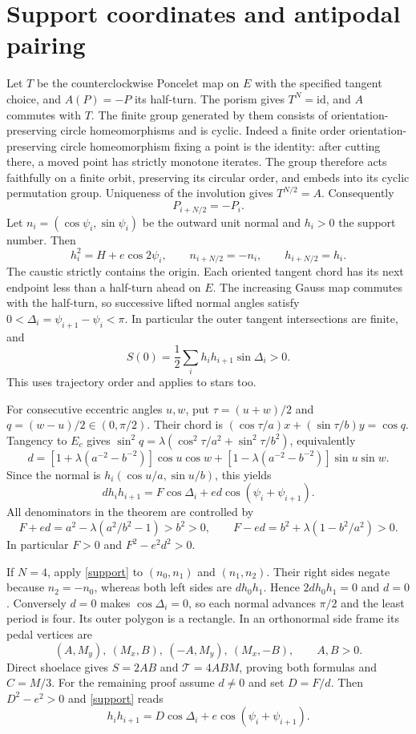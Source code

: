 \documentclass[11pt]{article}
\begin{document}
\section{Support coordinates and antipodal pairing}
Let $T$ be the counterclockwise Poncelet map on $E$ with the specified tangent
choice, and $A(P)=-P$ its half-turn. The porism gives $T^N=\mathrm{id}$,
and $A$ commutes with $T$. The finite group generated by them consists of
orientation-preserving circle homeomorphisms and is cyclic. Indeed a finite
order orientation-preserving circle homeomorphism fixing a point is the
identity: after cutting there, a moved point has strictly monotone iterates.
The group therefore acts faithfully on a finite orbit, preserving its circular
order, and embeds into its cyclic permutation group. Uniqueness of the
involution gives $T^{N/2}=A$. Consequently
\begin{equation}\label{antipodes}
 P_{i+N/2}=-P_i.
\end{equation}
Let $n_i=(\cos\psi_i,\sin\psi_i)$ be the outward unit normal and $h_i>0$
the support number. Then
\[
 h_i^2=H+e\cos2\psi_i,\qquad
 n_{i+N/2}=-n_i,\qquad h_{i+N/2}=h_i.
\]
The caustic strictly contains the origin. Each oriented tangent chord has its
next endpoint less than a half-turn ahead on $E$. The increasing Gauss map
commutes with the half-turn, so successive lifted normal angles satisfy
$0<\Delta_i=\psi_{i+1}-\psi_i<\pi$. In particular the outer tangent
intersections are finite, and
\begin{equation}\label{positive}
 S(0)=\frac12\sum_i h_i h_{i+1}\sin\Delta_i>0.
\end{equation}
This uses trajectory order and applies to stars too.

For consecutive eccentric angles $u,w$, put $\tau=(u+w)/2$ and
$q=(w-u)/2\in(0,\pi/2)$. Their chord is
$(\cos\tau/a)x+(\sin\tau/b)y=\cos q$. Tangency to $E_c$ gives
$\sin^2q=\lambda(\cos^2\tau/a^2+\sin^2\tau/b^2)$, equivalently
\[
 d=[1+\lambda(a^{-2}-b^{-2})]\cos u\cos w
  +[1-\lambda(a^{-2}-b^{-2})]\sin u\sin w.
\]
Since the normal is $h_i(\cos u/a,\sin u/b)$, this yields
\begin{equation}\label{support}
 d h_i h_{i+1}=F\cos\Delta_i+ed\cos(\psi_i+\psi_{i+1}).
\end{equation}
All denominators in the theorem are controlled by
\[
 F+ed=a^2-\lambda(a^2/b^2-1)>b^2>0,\qquad
 F-ed=b^2+\lambda(1-b^2/a^2)>0.
\]
In particular $F>0$ and $F^2-e^2d^2>0$.

If $N=4$, apply \eqref{support} to $(n_0,n_1)$ and $(n_1,n_2)$.
Their right sides negate because $n_2=-n_0$, whereas both left sides are
$d h_0h_1$. Hence $2d h_0h_1=0$ and $d=0$.
Conversely $d=0$ makes $\cos\Delta_i=0$, so each normal advances $\pi/2$
and the least period is four. Its outer polygon is a rectangle. In an
orthonormal side frame its pedal vertices are
\[
 (A,M_y),\ (M_x,B),\ (-A,M_y),\ (M_x,-B),\qquad A,B>0.
\]
Direct shoelace gives $S=2AB$ and $\mathcal T=4ABM$, proving both formulas
and $C=M/3$. For the remaining proof assume $d\ne0$ and set $D=F/d$.
Then $D^2-e^2>0$ and \eqref{support} reads
\begin{equation}\label{Dsupport}
 h_i h_{i+1}=D\cos\Delta_i+e\cos(\psi_i+\psi_{i+1}).
\end{equation}
\end{document}

